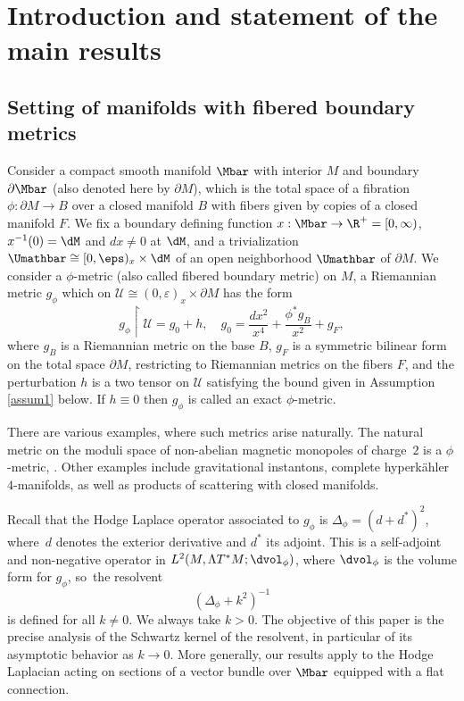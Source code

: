 \section{Introduction and statement of the main results}

\subsection{Setting of manifolds with fibered boundary metrics}

Consider a compact smooth manifold $\Mbar$
with interior $M$ and boundary $\partial \Mbar$
(also denoted here by $\partial M$),
which is the total space of a fibration
$\phi: \partial M \to B$ over a closed manifold $B$ with fibers given by
copies of a closed manifold $F$. We fix a boundary defining function
$x:\Mbar\to\R^+=[0,\infty)$, \ie $x^{-1}(0)=\dM$ and $dx\neq0$ at $\dM$, and a trivialization $\Umathbar\cong [0,\eps)_x\times\dM$ of an open
neighborhood $\Umathbar$ of $\partial M$. We consider a $\phi$-metric (also called fibered boundary metric) on $M$, \ie a Riemannian metric $g_\phi$ which on $\mathscr{U} \cong (0,\varepsilon)_x\times\partial M$ has the form
\begin{equation}\label{g-phi-def}
g_{\phi} \restriction \mathscr{U} = g_0 + h,\quad g_0=\frac{dx^{2}}{x^4} + \frac{\phi^{*}g_{B}}{x^{2}} + g_{F},
\end{equation}
where $g_{B}$ is a Riemannian metric on the base $B$, $g_{F}$ is a symmetric bilinear form on the
total space $\partial M$, restricting to Riemannian metrics on the fibers $F$, and the perturbation $h$ is a two tensor on $\mathscr{U}$ satisfying the bound given in Assumption \ref{assum1} below.
If $h\equiv 0$ then
$g_\phi$ is called an exact $\phi$-metric.

\begin{Exs}
There are various examples, where such metrics arise naturally.
The natural metric on the moduli space of non-abelian magnetic monopoles
of charge~$2$ is a $\phi$-metric, \cf \cite{gravi-ins, kottke-singer, fritsch}. Other examples include
gravitational instantons, \ie complete hyperkähler $4$-manifolds, as well as products
of scattering with closed manifolds.
\end{Exs}

Recall that the Hodge Laplace operator associated to $g_\phi$ is $\Delta_{\phi} = (d+d^*)^2$,
where~$d$ denotes the exterior derivative and
$d^*$ its adjoint. This is a self-adjoint and non-negative operator in $L^2(M,\Lambda T^*M; \dvol_\phi)$,
where $\dvol_\phi$ is the volume form for $g_\phi$, so~the resolvent
\[
(\Delta_{\phi}+k^2)^{-1}
\]
is defined for all $k\neq0$. We always take $k>0$. The objective of this paper is
the precise analysis of the Schwartz kernel of the resolvent, in particular of its asymptotic behavior as $k\to0$.
More generally, our results apply to the Hodge Laplacian acting on sections of a vector bundle over $\Mbar$ equipped with a flat connection.

